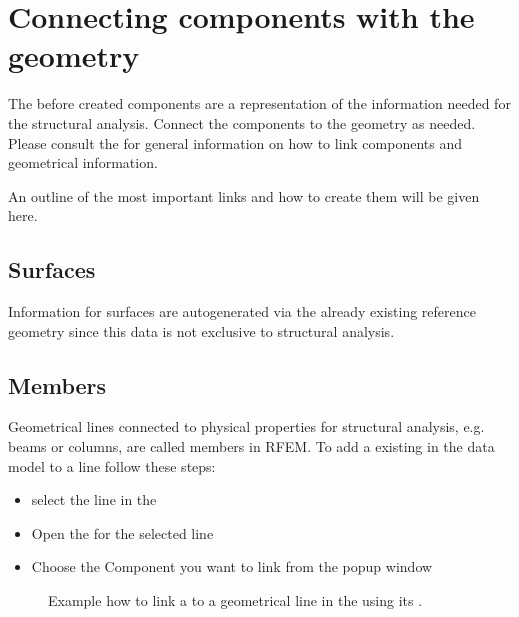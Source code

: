 \documentclass[letterpaper,10pt,english]{jupyterBook}
\let\sphinxpxdimen\pdfpxdimen\else\newdimen\sphinxpxdimen
\begin{document}
\section{Connecting components with the geometry}
\label{\detokenize{Setting_up_a_problem:connecting-components-with-the-geometry}}
\sphinxAtStartPar
The before created components are a representation of the information needed for the structural analysis. Connect the
components to the geometry as needed. Please consult
the 
for general information on how to link components and geometrical information.

\sphinxAtStartPar
An outline of the most important links and how to create them will be given here.


\subsection{Surfaces}
\label{\detokenize{Setting_up_a_problem:surfaces}}
\sphinxAtStartPar
Information for surfaces are autogenerated via the already existing reference geometry since this data is not exclusive
to structural analysis.


\subsection{Members}
\label{\detokenize{Setting_up_a_problem:members}}
\sphinxAtStartPar
Geometrical lines connected to physical properties for structural analysis, e.g. beams or columns, are called members in
RFEM. To add a  existing in the data model to a line follow these steps:
\begin{itemize}
\item {} 
\sphinxAtStartPar
select the line in the 

\item {} 
\sphinxAtStartPar
Open the  for the selected line

\item {} 
\sphinxAtStartPar
Choose the Component you want to link from the pop\sphinxhyphen{}up window

\end{itemize}

\begin{figure}[htbp]
\centering
\capstart

\noindent\sphinxincludegraphics[height=500\sphinxpxdimen]{{add_member}.png}
\caption{Example how to link a  to a geometrical line in the  using its .}\label{\detokenize{Setting_up_a_problem:add-member}}\end{figure}
\end{document}
